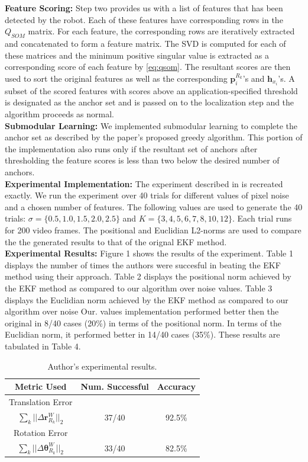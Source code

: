 \documentclass[10pt,twocolumn,letterpaper]{article}
\begin{document}
\textbf{Feature Scoring:} Step two provides us with a list of features that has been detected by the robot. Each of these features have corresponding rows in the $Q_{SOM}$ matrix. For each feature, the corresponding rows are iteratively extracted and concatenated to form a feature matrix. 
The SVD is computed for each of these matrices and the minimum positive singular value is extracted as a
 corresponding score of each feature by \eqref{eq:qsom}. 
 The resultant scores are then used to sort the original features as well 
as the corresponding $\boldsymbol{p}_{i}^{R_k}$'s and $\boldsymbol{h}_{x_i}$'s. A subset of the scored features with scores above an 
application-specified threshold is designated as the anchor set and is passed on to the localization step and the algorithm proceeds as normal.\\
\indent{}\textbf{Submodular Learning:} We implemented submodular learning to complete the anchor set as described by the paper's proposed greedy algorithm. This portion of the implementation also runs only if the resultant set of anchors after thresholding the feature scores is less than two below the desired number of 
anchors.\\
\indent{}\textbf{Experimental Implementation:} The experiment described in \cite{Zhang_2015_CVPR} is recreated exactly.
We run the experiment over 40 trials for different values of pixel noise and a chosen number of features. The following values are used to generate the 40 trials: $\sigma=\{0.5, 1.0, 1.5, 2.0, 2.5\} $ and $ K = \{ 3, 4, 5, 6, 7, 8, 10, 12 \}$. Each trial runs for 200 video frames. The positional and Euclidian L2-norms are used to compare the the generated results to that of the orignal EKF method.\\
\indent{}\textbf{Experimental Results:} Figure 1 shows the results of the experiment. 
Table 1 displays the number of times the authors were succesful in beating the EKF method using their approach.
Table 2 displays the positional norm achieved by the EKF method as compared to our algorithm over noise values. 
Table 3 displays the Euclidian norm achieved by the EKF method as compared to our algorithm over noise Our. 
values implementation performed better then the original in 8/40 cases (20\%) in terms of the positional norm. 
In terms of the Euclidian norm, it performed better in 14/40 cases (35\%). These results are tabulated in Table 4.
\begin{table}[h]
\begin{center}
\begin{tabular}{|c|c|c|}
\hline
Metric Used & Num. Successful & Accuracy  \\
\hline
 Translation Error &   &   \\
$ \sum_k || \Delta \boldsymbol{r}_{R_k}^W ||_2 $ & 37/40 & 92.5\% \\ 
\hline
Rotation Error &   &   \\
$ \sum_k || \Delta \boldsymbol{\theta}_{R_k}^W ||_2 $ & 33/40 & 82.5\% \\
\hline
\end{tabular}
\end{center}
\caption{Author's experimental results.}
\end{table}
\end{document}
